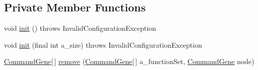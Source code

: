 \subsection*{Private Member Functions}
\begin{DoxyCompactItemize}
\item 
void \hyperlink{classorg_1_1jgap_1_1gp_1_1impl_1_1_program_chromosome_a1d821adfada0d4ba257d1ac1cf15969a}{init} ()  throws Invalid\-Configuration\-Exception 
\item 
void \hyperlink{classorg_1_1jgap_1_1gp_1_1impl_1_1_program_chromosome_ac082a0f6a404ae98a32289ca561b765f}{init} (final int a\-\_\-size)  throws Invalid\-Configuration\-Exception 
\item 
\hyperlink{classorg_1_1jgap_1_1gp_1_1_command_gene}{Command\-Gene}\mbox{[}$\,$\mbox{]} \hyperlink{classorg_1_1jgap_1_1gp_1_1impl_1_1_program_chromosome_abb3f952c7eb74808cf6dc8dda7bfd94a}{remove} (\hyperlink{classorg_1_1jgap_1_1gp_1_1_command_gene}{Command\-Gene}\mbox{[}$\,$\mbox{]} a\-\_\-function\-Set, \hyperlink{classorg_1_1jgap_1_1gp_1_1_command_gene}{Command\-Gene} node)
\end{DoxyCompactItemize}
